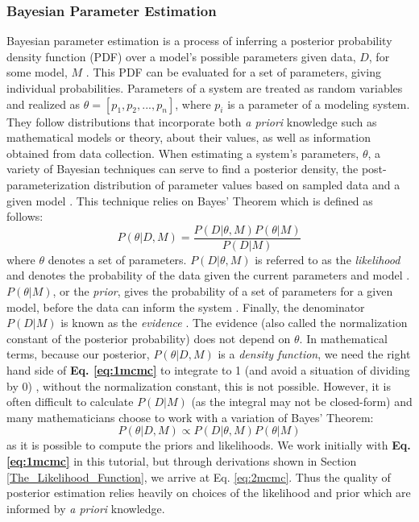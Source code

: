 \subsubsection{Bayesian Parameter Estimation}
Bayesian parameter estimation is a process of inferring a posterior probability density function (PDF) over a model's possible parameters given data, $D$, for some model, $M$ \cite{astrostats}. This PDF can be evaluated for a set of parameters, giving individual probabilities. Parameters of a system are treated as random variables and realized as $\theta = [p_1, p_2,...,p_n]$, where $p_i$ is a parameter of a modeling system. They follow distributions that incorporate both \emph{a priori} knowledge such as mathematical models or theory, about their values, as well as information obtained from data collection. When estimating a system's parameters, $\theta$, a variety of Bayesian techniques can serve to find a posterior density, the post-parameterization distribution of parameter values based on sampled data and a given model \cite{bayesprior}. This technique relies on Bayes' Theorem which is defined as follows:
\begin{equation} \label{eq:1mcmc}
P(\theta | D, M) = \frac{P(D|\theta, M)P(\theta|M)}{P(D|M)}
\end{equation}
where $\theta$ denotes a set of parameters. $P(D|\theta, M)$ is referred to as the \emph{likelihood} and denotes the probability of the data given the current parameters and model \cite{astrostats}. $P(\theta|M)$, or the \emph{prior}, gives the probability of a set of parameters for a given model, before the data can inform the system \cite{astrostats}. Finally, the denominator $P(D|M)$ is known as the \emph{evidence} \cite{astrostats}. The evidence (also called the normalization constant of the posterior probability) does not depend on $\theta$. In mathematical terms, because our posterior, $P(\theta|D,M)$ is a \textit{density function}, we need the right hand side of \textbf{Eq. \ref{eq:1mcmc}} to integrate to 1 (and avoid a situation of dividing by 0) \cite{bayesprior}, without the normalization constant, this is not possible. However, it is often difficult to calculate $P(D|M)$ (as the integral may not be closed-form) and many mathematicians choose to work with a variation of Bayes' Theorem:
\begin{equation} \label{eq:2mcmc}
P(\theta|D,M) \propto P(D|\theta,M)P(\theta|M)
\end{equation}
as it is possible to compute the priors and likelihoods. We work initially with \textbf{Eq. \ref{eq:1mcmc}} in this tutorial, but 
through derivations shown in Section \ref{The_Likelihood_Function}, we arrive at Eq. \ref{eq:2mcmc}. Thus the quality of posterior estimation relies heavily on choices of the likelihood and prior which are informed by \textit{a priori} knowledge.
